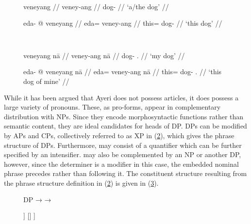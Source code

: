 \begin{figure}
\ex{}\label{ex:suffixcase}%
\begin{minipage}[t]{.5\remaining}%
	\tl\quad\begingl
		\gla veneyang //
		\glb veney-ang //
		\glc dog-\Aarg{} //
		\glft `a/the dog' //
	\endgl\medskip

	\tl\quad\begingl
		\gla eda- @ veneyang //
		\glb eda= veney-ang //
		\glc this= dog-\Aarg{} //
		\glft `this dog' //
	\endgl
\end{minipage}
~
\begin{minipage}[t]{.5\remaining}%
	\tl\quad\begingl
		\gla veneyang nā //
		\glb veney-ang nā //
		\glc dog-\Aarg{} \Fsg{}.\Gen{} //
		\glft `my dog' //
	\endgl\medskip

	\tl\quad\begingl
		\gla eda- @ veneyang nā //
		\glb eda= veney-ang nā //
		\glc this= dog-\Aarg{} \Fsg{}.\Gen{} //
		\glft `this dog of mine' //
	\endgl
\end{minipage}
\xe
\end{figure}


While it has been argued that Ayeri does not possess articles, it does possess
a large variety of pronouns. These, as pro-forms, appear in complementary
distribution with NPs. Since they encode morphosyntactic functions rather than
semantic content, they are ideal candidates for heads of DP. DPs can be
modified by APs and CPs, collectively referred to as XP in (\ref{ex:dpstruct}),
which gives the phrase structure of DPs. Furthermore,  may consist of
a quantifier which can be further specified by an intensifier.  may also
be complemented by an NP or another DP, however, since the determiner is a
modifier in this case, the embedded nominal phrase precedes  rather
than following it. The constituent structure resulting from the phrase
structure definition in (\ref{ex:dpstruct}) is given in (\ref{ex:dpcstruct}).

\begin{figure}
\pex\label{ex:dpstruct}
\a DP →  
\a {} →  
\xe
\end{figure}

\begin{figure}
\ex\label{ex:dpcstruct}
\begin{forest}
[{\anno[\pass{\DF} $\vee$ \pass{\GF}]{DP}}
	[\anno{\xbar{D}}
		[{\anno{YP}}]
		[\anno{\xhead{D}}]
	]
	[{}]
]
\end{forest}
\xe
\end{figure}

